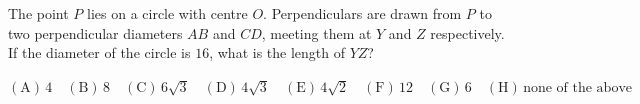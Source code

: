 The point $P$ lies on a circle with centre $O$. Perpendiculars are drawn from $P$ to two perpendicular diameters $AB$ and $CD$, meeting them at $Y$ and $Z$ respectively. If the diameter of the circle is $16$, what is the length of $YZ$?

$\mathrm{(A)}\,4\quad\mathrm{(B)}\,8\quad\mathrm{(C)}\,6\sqrt{3}\quad\mathrm{(D)}\,4\sqrt{3}\quad\mathrm{(E)}\,4\sqrt{2}\quad\mathrm{(F)}\,12\quad\mathrm{(G)}\,6\quad\mathrm{(H)}\,\text{none of the above}$
